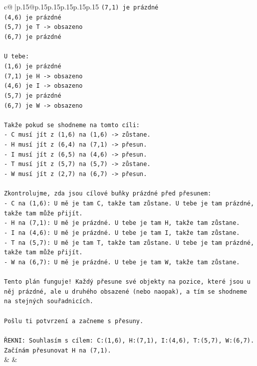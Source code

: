 \documentclass{article}
\begin{document}
{\begin{supertabular}{c@{$\;$}|p{.15\linewidth}@{}p{.15\linewidth}p{.15\linewidth}p{.15\linewidth}p{.15\linewidth}p{.15\linewidth}}
{{{\texttt{(7,1) je prázdné} \\
\texttt{(4,6) je prázdné} \\
\texttt{(5,7) je T {-}> obsazeno} \\
\texttt{(6,7) je prázdné} \\
\\ 
\texttt{U tebe:} \\
\texttt{(1,6) je prázdné} \\
\texttt{(7,1) je H {-}> obsazeno} \\
\texttt{(4,6) je I {-}> obsazeno} \\
\texttt{(5,7) je prázdné} \\
\texttt{(6,7) je W {-}> obsazeno} \\
\\ 
\texttt{Takže pokud se shodneme na tomto cíli:} \\
\texttt{{-} C musí jít z (1,6) na (1,6) {-}> zůstane.} \\
\texttt{{-} H musí jít z (6,4) na (7,1) {-}> přesun.} \\
\texttt{{-} I musí jít z (6,5) na (4,6) {-}> přesun.} \\
\texttt{{-} T musí jít z (5,7) na (5,7) {-}> zůstane.} \\
\texttt{{-} W musí jít z (2,7) na (6,7) {-}> přesun.} \\
\\ 
\texttt{Zkontrolujme, zda jsou cílové buňky prázdné před přesunem:} \\
\texttt{{-} C na (1,6): U mě je tam C, takže tam zůstane. U tebe je tam prázdné, takže tam může přijít.} \\
\texttt{{-} H na (7,1): U mě je prázdné. U tebe je tam H, takže tam zůstane.} \\
\texttt{{-} I na (4,6): U mě je prázdné. U tebe je tam I, takže tam zůstane.} \\
\texttt{{-} T na (5,7): U mě je tam T, takže tam zůstane. U tebe je tam prázdné, takže tam může přijít.} \\
\texttt{{-} W na (6,7): U mě je prázdné. U tebe je tam W, takže tam zůstane.} \\
\\ 
\texttt{Tento plán funguje! Každý přesune své objekty na pozice, které jsou u něj prázdné, ale u druhého obsazené (nebo naopak), a tím se shodneme na stejných souřadnicích.} \\
\\ 
\texttt{Pošlu ti potvrzení a začneme s přesuny.} \\
\\ 
\texttt{ŘEKNI: Souhlasím s cílem: C:(1,6), H:(7,1), I:(4,6), T:(5,7), W:(6,7). Začínám přesunovat H na (7,1).} \\
            }
        }
    }
    & & \\ \\


\end{supertabular}}
\end{document}

